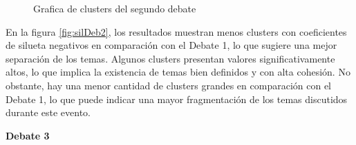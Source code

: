 \documentclass[10pt, a4paper]{article}
\begin{document}
\begin{figure}[h!]
\begin{minipage}{0.49\textwidth}
			\caption{Grafica de clusters del segundo debate}
			\label{fig:clustDeb2}
		\end{minipage}
	\end{figure}
	
	En la figura \ref{fig:silDeb2}, los resultados muestran menos clusters con coeficientes de silueta negativos en comparación con el Debate 1, lo que sugiere una mejor separación de los temas. Algunos clusters presentan valores significativamente altos, lo que implica la existencia de temas bien definidos y con alta cohesión. No obstante, hay una menor cantidad de clusters grandes en comparación con el Debate 1, lo que puede indicar una mayor fragmentación de los temas discutidos durante este evento.
	
	\vspace{4mm}
	\textbf{Debate 3}
\end{document}

